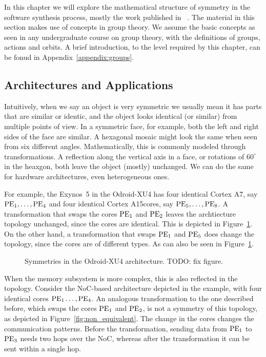 In this chapter we will explore the mathematical structure of symmetry in the software synthesis process, mostly the work published in ~\cite{goens_iess15,goens_taco17,goens_scopes17,goens_tcad21}.
The material in this section makes use of concepts in group theory.
We assume the basic concepts as seen in any undergraduate course on group
theory, with the definitions of groups, actions and orbits.
A brief introduction, to the level required by this chapter, can be fonud in Appendix~\ref{appendix:groups}. 

\subsection{Architectures and Applications}

Intuitively, when we say an object is very symmetric we usually mean it has parts that are similar or identic, and the object looks identical (or similar) from multiple points of view.
In a symmetric face, for example, both the left and right sides of the face are similar. A hexagonal mosaic might look the same when seen from six different angles.
Mathematically, this is commonly modeled through transformations. A reflection along the vertical axis in a face, or rotations of $60^\circ$ in the heaxgon, both leave the object (mostly) unchanged.
We can do the same for hardware architectures, even heterogeneous ones.

For example, the Exynos~5 in the Odroid-XU4 has four identical Cortex A7\texttrademark, say $\operatorname{PE}_1,\ldots,\operatorname{PE}_4$ and four identical Cortex A15\texttrademark cores, say $\operatorname{PE}_5,\ldots,\operatorname{PE}_8$.
A transformation that swaps the cores $\operatorname{PE}_1$ and $\operatorname{PE}_2$ leaves the archtiecture topology unchanged, since the cores are identical. This is depicted in Figure~\ref{fig:exynos_symmetries}.
On the other hand, a transformation that swaps $\operatorname{PE}_1$ and $\operatorname{PE}_5$ does change the topology, since the cores are of different types. As can also be seen in Figure~\ref{fig:exynos_symmetries}.
\begin{figure}[h]
	\centering
\resizebox{0.3\textwidth}{!}{
   \begin{tikzpicture}
     
   \end{tikzpicture}
 }
   \caption{Symmetries in the Odroid-XU4 architecture. TODO: fix figure.}
   \label{fig:exynos_symmetries}
\end{figure}

When the memory subsystem is more complex, this is also reflected in the topology. Consider the \ac{NoC}-based architecture depicted in the example, with four identical cores $\operatorname{PE}_1\ldots,\operatorname{PE}_4$.
An analogous transformation to the one described before, which swaps the cores $\operatorname{PE}_1$ and $\operatorname{PE}_2$, is not a symmetry of this topology, as depicted in Figure~\ref{fig:non_equivalent}.
The change in the cores changes the communication patterns.
Before the transformation, sending data from $\operatorname{PE}_1$ to $\operatorname{PE}_3$ needs two hops over the \ac{NoC}, whereas after the transformation it can be sent within a single hop.

